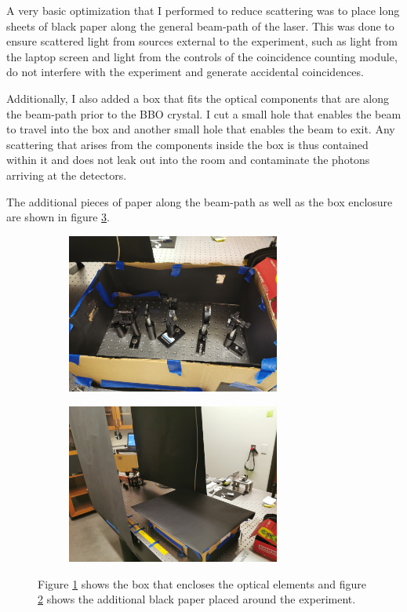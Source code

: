 \documentclass[letterpaper, 11 pt]{article}
\begin{document}
A very basic optimization that I performed to reduce scattering was to place
long sheets of black paper along the general beam-path of the laser. This was
done to ensure scattered light from sources external to the experiment, such as
light from the laptop screen and light from the controls of the coincidence
counting module, do not interfere with the experiment and generate accidental
coincidences.

Additionally, I also added a box that fits the optical components that are along
the beam-path prior to the BBO crystal. I cut a small hole that enables the beam
to travel into the box and another small hole that enables the beam to exit. Any
scattering that arises from the components inside the box is thus contained
within it and does not leak out into the room and contaminate the photons
arriving at the detectors. 

The additional pieces of paper along the beam-path as well as the box enclosure
are shown in figure \ref{fig:paper_scatter}.
\begin{figure}[H]%
    \centering
    \begin{subfigure}{.4\textwidth}
    \includegraphics[width=7cm]{black_box.jpg}
    \caption{ }
    \label{fig:box}
    \end{subfigure}
    \begin{subfigure}{.4\textwidth}
    \includegraphics[width = 7cm]{black_surround.jpg}
    \caption{ }
    \label{fig:rail}
    \end{subfigure}
    \caption{Figure \ref{fig:box} shows the box that encloses the optical elements
    and figure \ref{fig:rail} shows the additional black paper placed around the experiment.}
    \label{fig:paper_scatter}
\end{figure}
\end{document}
